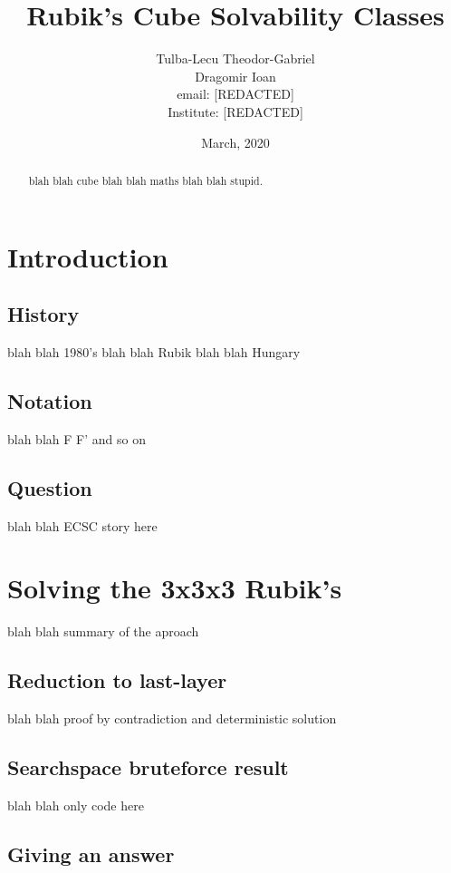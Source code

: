 \documentclass{article}
\title{Rubik's Cube Solvability Classes}
\date{March, 2020}
\author{Tulba-Lecu Theodor-Gabriel\\
	Dragomir Ioan\\
	email: [REDACTED] \\
	Institute: [REDACTED]}
\begin{document}
    
    \maketitle


    \begin{abstract}
        blah blah cube blah blah maths blah blah stupid.
    \end{abstract}

    \newpage
    
    \section{Introduction}
    
        \subsection{History}
            blah blah 1980's blah blah Rubik blah blah Hungary
        
        \subsection{Notation}
            blah blah F F' and so on
        
        \subsection{Question}
            blah blah ECSC story here
    
    \section{Solving the 3x3x3 Rubik's}
        blah blah summary of the aproach
    
        \subsection{Reduction to last-layer}
            blah blah proof by contradiction and deterministic solution
        
        \subsection{Searchspace bruteforce result}
            blah blah only code here
        
        \subsection{Giving an answer}
\end{document}
